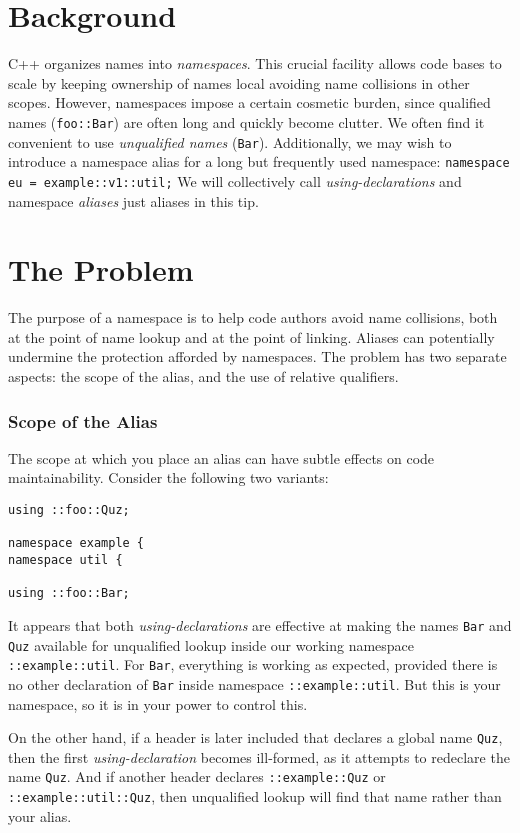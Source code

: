 \section{Background}
C++ organizes names into \emph{namespaces}. This crucial facility allows code bases to scale by keeping ownership of names local avoiding name collisions in other scopes. However, namespaces impose a certain cosmetic burden, since qualified names (\texttt{foo::Bar}) are often long and quickly become clutter. We often find it convenient to use \emph{unqualified names} (\texttt{Bar}). Additionally, we may wish to introduce a namespace alias for a long but frequently used namespace: \texttt{namespace eu = example::v1::util;} We will collectively call \emph{using-declarations} and namespace \emph{aliases} just aliases in this tip.


\section{The Problem}
The purpose of a namespace is to help code authors avoid name collisions, both at the point of name lookup and at the point of linking. Aliases can potentially undermine the protection afforded by namespaces. The problem has two separate aspects: the scope of the alias, and the use of relative qualifiers.

\subsubsection{Scope of the Alias}
The scope at which you place an alias can have subtle effects on code maintainability. Consider the following two variants:
\begin{verbatim}
using ::foo::Quz;

namespace example {
namespace util {

using ::foo::Bar;
\end{verbatim}

It appears that both \emph{using-declarations} are effective at making the names \texttt{Bar} and \texttt{Quz} available for unqualified lookup inside our working namespace \texttt{::example::util}. For \texttt{Bar}, everything is working as expected, provided there is no other declaration of \texttt{Bar} inside namespace \texttt{::example::util}. But this is your namespace, so it is in your power to control this.

On the other hand, if a header is later included that declares a global name \texttt{Quz}, then the first \emph{using-declaration} becomes ill-formed, as it attempts to redeclare the name \texttt{Quz}. And if another header declares \texttt{::example::Quz} or \texttt{::example::util::Quz}, then unqualified lookup will find that name rather than your alias.

